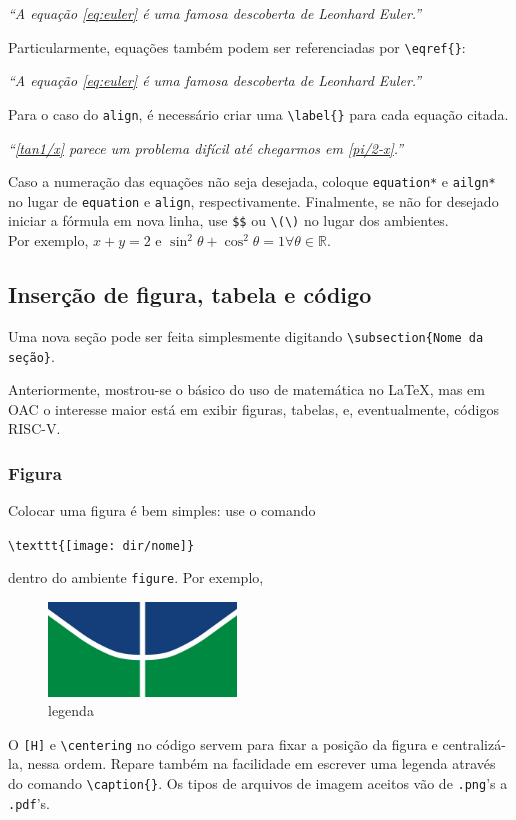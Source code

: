 \documentclass[9pt, twocolumn]{extarticle}
\begin{document}
		\textit{``A equação \ref{eq:euler} é uma famosa descoberta de Leonhard Euler.''}
			
		Particularmente, equações também podem ser referenciadas por \verb|\eqref{}|:
		
		\textit{``A equação \eqref{eq:euler} é uma famosa descoberta de Leonhard Euler.''}	
		
		Para o caso do \verb|align|, é necessário criar uma \verb|\label{}| para cada equação citada.
		
		\textit{``\eqref{tan1/x} parece um problema difícil até chegarmos em \eqref{pi/2-x}.''}	
			
		Caso a numeração das equações não seja desejada, coloque {\tt equation*} e {\tt ailgn*} no lugar de {\tt equation} e {\tt align}, respectivamente.
		Finalmente, se não for desejado iniciar a fórmula em nova linha, use \verb|$$| ou \verb|\(\)| no lugar dos ambientes.\\
		Por exemplo,
		$x+y=2$ e \(\sin^2\theta+\cos^2\theta=1 \forall \theta\in\mathbb{R}\).	
			
		\subsection{Inserção de figura, tabela e código}
			Uma nova seção pode ser feita simplesmente digitando \verb|\subsection{Nome da seção}|. 
			
			Anteriormente, mostrou-se o básico do uso de matemática no \LaTeX, mas em OAC o interesse maior está em exibir figuras, tabelas, e, eventualmente, códigos RISC-V.
			
			\subsubsection{Figura}
				Colocar uma figura é bem simples:
				use o comando 
				
				\verb|\texttt{[image: dir/nome]}|
				
				dentro do ambiente {\tt figure}. Por exemplo,
				\begin{figure}[H]\centering
					\includegraphics[width=5cm]{figuras/logo_unb}
					\caption{legenda}
				\end{figure}
				O {\tt [H]} e \verb|\centering| no código servem para fixar a posição da figura e centralizá-la, nessa ordem.
				Repare também na facilidade em escrever uma legenda através do comando \verb|\caption{}|.
				Os tipos de arquivos de imagem aceitos vão de {\tt.png}'s a {\tt.pdf}'s.
			
\end{document}
